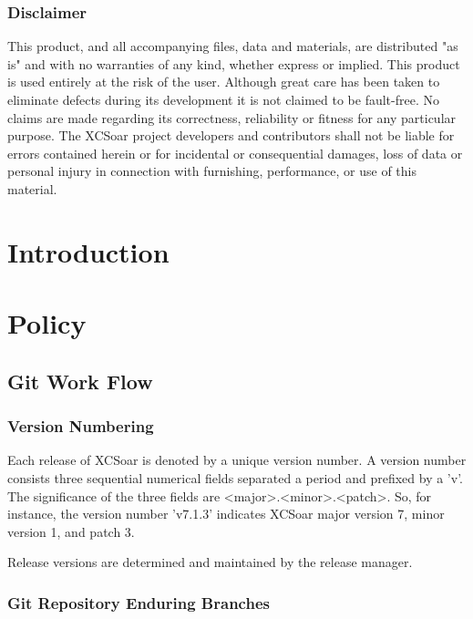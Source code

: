 \documentclass[a4paper,12pt]{refrep}
\begin{document}
\subsection*{Disclaimer}

This product, and all accompanying files, data and materials, are
distributed "as is" and with no warranties of any kind, whether
express or implied.  This product is used entirely at the risk of the
user.  Although great care has been taken to eliminate defects during
its development it is not claimed to be fault-free. No claims are made
regarding its correctness, reliability or fitness for any particular
purpose.  The XCSoar project developers and contributors shall not be
liable for errors contained herein or for incidental or consequential
damages, loss of data or personal injury in connection with
furnishing, performance, or use of this material.


\chapter{Introduction}\label{cha:introduction}



\chapter{Policy}\label{cha:policy}

\section{Git Work Flow}

\subsection{Version Numbering}

Each release of XCSoar is denoted by a unique version number. A version
number consists three sequential numerical fields separated a period and
prefixed by a 'v'. The significance of the three fields are
<major>.<minor>.<patch>. So, for instance, the version number 'v7.1.3'
indicates XCSoar major version 7, minor version 1, and patch 3.

Release versions are determined and maintained by the release manager.

\subsection{Git Repository Enduring Branches}
\end{document}
